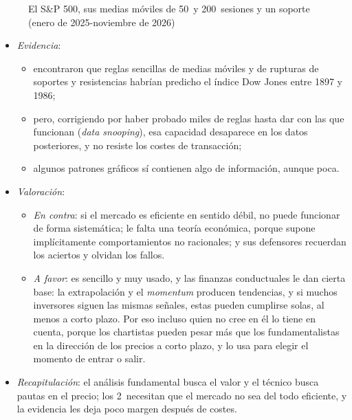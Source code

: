 \documentclass[11pt]{article}
\begin{document}
\begin{figure}[H]
\centering
\caption{El S\&P 500, sus medias móviles de 50~y 200~sesiones y un soporte (enero de 2025-noviembre de 2026)}\label{fig:sp500-soporte-medias}
\end{figure}
\begin{itemize}
\item \emph{Evidencia}:
  \begin{itemize}
  \item \textcite{BrockLakonishokLeBaron1992} encontraron que reglas sencillas de medias móviles y de rupturas de soportes y resistencias habrían predicho el índice Dow Jones entre 1897 y 1986;
  \item pero, corrigiendo por haber probado miles de reglas hasta dar con las que funcionan (\emph{data snooping}), esa capacidad desaparece en los datos posteriores\nocite{SullivanTimmermannWhite1999Data}, y no resiste los costes de transacción;
  \item algunos patrones gráficos sí contienen algo de información, aunque poca\nocite{LoMamayskyWang2000}.
  \end{itemize}
\item \emph{Valoración}:
  \begin{itemize}
  \item \emph{En contra}: si el mercado es eficiente en sentido débil, no puede funcionar de forma sistemática; le falta una teoría económica, porque supone implícitamente comportamientos no racionales; y sus defensores recuerdan los aciertos y olvidan los fallos.
  \item \emph{A favor}: es sencillo y muy usado, y las finanzas conductuales le dan cierta base: la extrapolación y el \emph{momentum} producen tendencias, y si muchos inversores siguen las mismas señales, estas pueden cumplirse solas, al menos a corto plazo. Por eso incluso quien no cree en él lo tiene en cuenta, porque los chartistas pueden pesar más que los fundamentalistas en la dirección de los precios a corto plazo, y lo usa para elegir el momento de entrar o salir.
  \end{itemize}
\item \emph{Recapitulación}: el análisis fundamental busca el valor y el técnico busca pautas en el precio; los 2~necesitan que el mercado no sea del todo eficiente, y la evidencia les deja poco margen después de costes.
\end{itemize}
\end{document}
